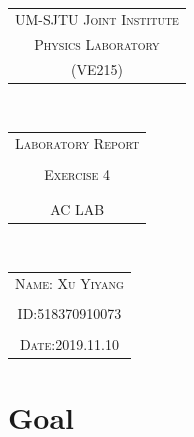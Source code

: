 \documentclass{article}
\begin{document}
\ \\[5cm]
\begin{table}[h]
\centering
\begin{tabular}{c}
\hline
\begin{minipage}{10cm}\vspace{2mm}\centering\LARGE{\textsc{UM-SJTU Joint Institute}}\vspace{2mm}\end{minipage}\\
\textsc{Physics Laboratory}\\
\textsc{(VE215)}\\
\hline
\end{tabular}
\end{table}
\ \\[3cm]
\begin{table}[h]
\centering
\begin{tabular}{c}
\large{\textsc{Laboratory Report}}\\
\\
\textsc{Exercise 4}\\
\\
\\
\textsc{AC LAB}
\end{tabular}
\end{table}

\ \\[3cm]
\begin{table}[h]
\centering
\begin{tabular}{c}
\large{\textsc{Name: Xu Yiyang}}\\
\\
\textsc{ID:518370910073}\\
\\
\textsc{Date:2019.11.10}
\end{tabular}
\end{table}
\newpage


\section{Goal}
\end{document}
